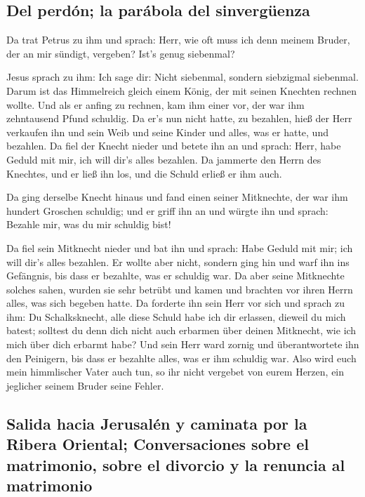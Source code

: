 \hypertarget{del-perduxf3n-la-paruxe1bola-del-sinverguxfcenza}{%
\subsection{Del perdón; la parábola del
sinvergüenza}\label{del-perduxf3n-la-paruxe1bola-del-sinverguxfcenza}}

 Da trat Petrus zu ihm und sprach: Herr, wie oft muss ich
denn meinem Bruder, der an mir sündigt, vergeben? Ist's genug siebenmal?

 Jesus sprach zu ihm: Ich sage dir: Nicht siebenmal,
sondern siebzigmal siebenmal.  Darum ist das Himmelreich
gleich einem König, der mit seinen Knechten rechnen wollte.
 Und als er anfing zu rechnen, kam ihm einer vor, der war
ihm zehntausend Pfund schuldig.  Da er's nun nicht hatte,
zu bezahlen, hieß der Herr verkaufen ihn und sein Weib und seine Kinder
und alles, was er hatte, und bezahlen.  Da fiel der
Knecht nieder und betete ihn an und sprach: Herr, habe Geduld mit mir,
ich will dir's alles bezahlen.  Da jammerte den Herrn des
Knechtes, und er ließ ihn los, und die Schuld erließ er ihm auch.

 Da ging derselbe Knecht hinaus und fand einen seiner
Mitknechte, der war ihm hundert Groschen schuldig; und er griff ihn an
und würgte ihn und sprach: Bezahle mir, was du mir schuldig bist!

 Da fiel sein Mitknecht nieder und bat ihn und sprach:
Habe Geduld mit mir; ich will dir's alles bezahlen.  Er
wollte aber nicht, sondern ging hin und warf ihn ins Gefängnis, bis dass
er bezahlte, was er schuldig war.  Da aber seine
Mitknechte solches sahen, wurden sie sehr betrübt und kamen und brachten
vor ihren Herrn alles, was sich begeben hatte.  Da
forderte ihn sein Herr vor sich und sprach zu ihm: Du Schalksknecht,
alle diese Schuld habe ich dir erlassen, dieweil du mich batest;
 solltest du denn dich nicht auch erbarmen über deinen
Mitknecht, wie ich mich über dich erbarmt habe?  Und sein
Herr ward zornig und überantwortete ihn den Peinigern, bis dass er
bezahlte alles, was er ihm schuldig war.  Also wird euch
mein himmlischer Vater auch tun, so ihr nicht vergebet von eurem Herzen,
ein jeglicher seinem Bruder seine Fehler.

\hypertarget{salida-hacia-jerusaluxe9n-y-caminata-por-la-ribera-oriental-conversaciones-sobre-el-matrimonio-sobre-el-divorcio-y-la-renuncia-al-matrimonio}{%
\subsection{Salida hacia Jerusalén y caminata por la Ribera Oriental;
Conversaciones sobre el matrimonio, sobre el divorcio y la renuncia al
matrimonio}\label{salida-hacia-jerusaluxe9n-y-caminata-por-la-ribera-oriental-conversaciones-sobre-el-matrimonio-sobre-el-divorcio-y-la-renuncia-al-matrimonio}}

